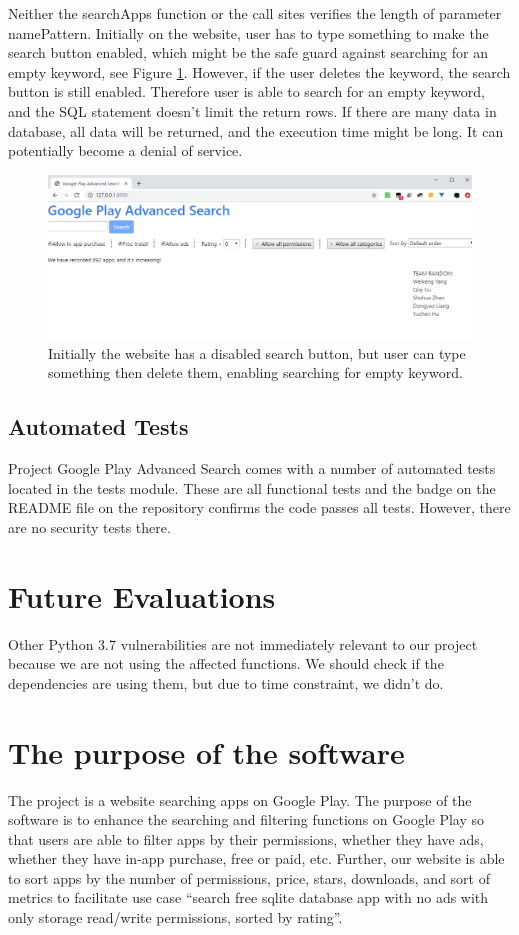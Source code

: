 \documentclass[12pt, a4paper]{article}
\begin{document}
Neither the searchApps function or the call sites verifies the length of parameter namePattern. Initially on the website, user has to type something to make the search button enabled, which might be the safe guard against searching for an empty keyword, see Figure \ref{fig:website-gray-buton}. However, if the user deletes the keyword, the search button is still enabled. Therefore user is able to search for an empty keyword, and the SQL statement doesn't limit the return rows. If there are many data in database, all data will be returned, and the execution time might be long. It can potentially become a denial of service.


\begin{figure}[ht]
\centering
\includegraphics[width=\textwidth]{website-gray-button.png}
\caption{Initially the website has a disabled search button, but user can type something then delete them, enabling searching for empty keyword.}
\label{fig:website-gray-buton}
\end{figure}

\subsection{Automated Tests}
Project Google Play Advanced Search comes with a number of automated tests located in the tests module. These are all functional tests and the badge on the README file on the repository confirms the code passes all tests. However, there are no security tests there.




\section{Future Evaluations}
Other Python 3.7 vulnerabilities are not immediately relevant to our project because we are not using the affected functions. We should check if the dependencies are using them, but due to time constraint, we didn't do.


\section{The purpose of the software}
The project is a website searching apps on Google Play. The purpose of the software is to enhance the searching and filtering functions on Google Play so that users are able to filter apps by their permissions, whether they have ads, whether they have in-app purchase, free or paid, etc. Further, our website is able to sort apps by the number of permissions, price, stars, downloads, and sort of metrics to facilitate use case “search free sqlite database app with no ads with only storage read/write permissions, sorted by rating”.
\end{document}
